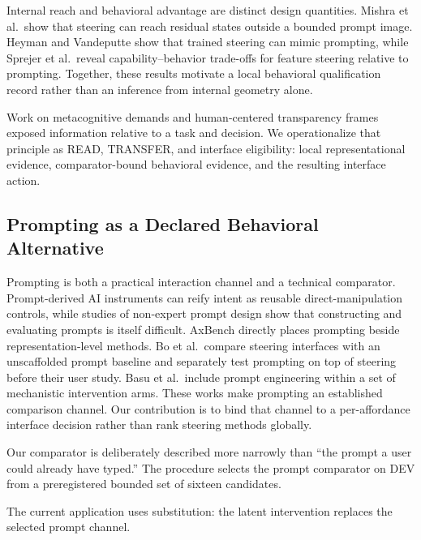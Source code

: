 \documentclass[manuscript,review,anonymous]{acmart}
\begin{document}
Internal reach and behavioral advantage are distinct design quantities. Mishra et al.~show that steering can reach residual states outside a bounded prompt image. \cite{mishra2026nonsurj} Heyman and Vandeputte show that trained steering can mimic prompting, while Sprejer et al.~reveal capability--behavior trade-offs for feature steering relative to prompting. \cite{heyman2026steer,sprejer2026mindgap} Together, these results motivate a local behavioral qualification record rather than an inference from internal geometry alone.

Work on metacognitive demands and human-centered transparency frames exposed information relative to a task and decision. \cite{tankelevitch2024metacog,liao2024transparency} {}%
We operationalize that principle as READ, TRANSFER, and interface eligibility: local representational evidence, comparator-bound behavioral evidence, and the resulting interface action.

\subsection{Prompting as a Declared Behavioral Alternative}\label{prompting-as-a-declared-behavioral-alternative}

Prompting is both a practical interaction channel and a technical comparator. Prompt-derived AI instruments can reify intent as reusable direct-manipulation controls, while studies of non-expert prompt design show that constructing and evaluating prompts is itself difficult. \cite{riche2025aiinstr,zamfirescuPereira2023johnny} AxBench directly places prompting beside representation-level methods. {}%
Bo et al.~compare steering interfaces with an unscaffolded prompt baseline and separately test prompting on top of steering before their user study. \cite{bo2026steerable} {}%
Basu et al.~include prompt engineering within a set of mechanistic intervention arms. {}%
These works make prompting an established comparison channel. Our contribution is to bind that channel to a per-affordance interface decision rather than rank steering methods globally.

Our comparator is deliberately described more narrowly than ``the prompt a user could already have typed.'' The procedure selects the prompt comparator on DEV from a preregistered bounded set of sixteen candidates. {}%
{}%

The current application uses substitution: the latent intervention replaces the selected prompt channel. {}%
\end{document}
